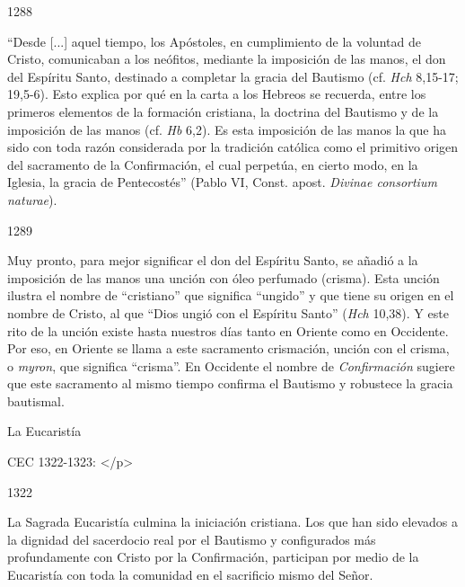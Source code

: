 			\begin{ccebody}\begin{ccenumber}1288\end{ccenumber} “Desde [...] aquel tiempo, los Apóstoles, en cumplimiento de la voluntad de Cristo, comunicaban a los neófitos, mediante la imposición de las manos, el don del Espíritu Santo, destinado a completar la gracia del Bautismo (cf. \textit{Hch} 8,15-17; 19,5-6). Esto explica por qué en la carta a los Hebreos se recuerda, entre los primeros elementos de la formación cristiana, la doctrina del Bautismo y de la imposición de las manos (cf. \textit{Hb} 6,2). Es esta imposición de las manos la que ha sido con toda razón considerada por la tradición católica como el primitivo origen del sacramento de la Confirmación, el cual perpetúa, en cierto modo, en la Iglesia, la gracia de Pentecostés” (Pablo VI, Const. apost. \textit{Divinae consortium naturae}).\end{ccebody}
			
			\begin{ccebody}\begin{ccenumber}1289 \end{ccenumber}Muy pronto, para mejor significar el don del Espíritu Santo, se añadió a la imposición de las manos una unción con óleo perfumado (crisma). Esta unción ilustra el nombre de “cristiano” que significa “ungido” y que tiene su origen en el nombre de Cristo, al que “Dios ungió con el Espíritu Santo” (\textit{Hch} 10,38). Y este rito de la unción existe hasta nuestros días tanto en Oriente como en Occidente. Por eso, en Oriente se llama a este sacramento crismación, unción con el crisma, o \textit{myron}, que significa “crisma”. En Occidente el nombre de \textit{Confirmación} sugiere que este sacramento al mismo tiempo confirma el Bautismo y robustece la gracia bautismal.\end{ccebody}
			
			\begin{ccetheme}La Eucaristía \end{ccetheme}
			
			\begin{ccereference}\end{ccereference}CEC 1322-1323: </p>
			
			\begin{ccebody}\begin{ccenumber}1322\end{ccenumber} La Sagrada Eucaristía culmina la iniciación cristiana. Los que han sido elevados a la dignidad del sacerdocio real por el Bautismo y configurados más profundamente con Cristo por la Confirmación, participan por medio de la Eucaristía con toda la comunidad en el sacrificio mismo del Señor.\end{ccebody}
			
